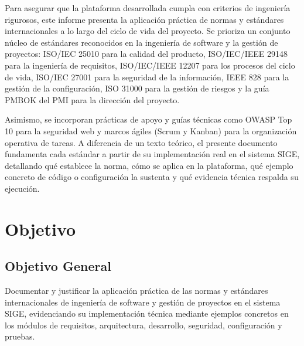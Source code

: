 \documentclass[12pt,a4paper]{article}
\begin{document}
Para asegurar que la plataforma desarrollada cumpla con criterios de ingeniería rigurosos, este informe presenta la aplicación práctica de normas y estándares internacionales a lo largo del ciclo de vida del proyecto. Se prioriza un conjunto núcleo de estándares reconocidos en la ingeniería de software y la gestión de proyectos: ISO/IEC 25010 para la calidad del producto, ISO/IEC/IEEE 29148 para la ingeniería de requisitos, ISO/IEC/IEEE 12207 para los procesos del ciclo de vida, ISO/IEC 27001 para la seguridad de la información, IEEE 828 para la gestión de la configuración, ISO 31000 para la gestión de riesgos y la guía PMBOK del PMI para la dirección del proyecto.

Asimismo, se incorporan prácticas de apoyo y guías técnicas como OWASP Top 10 para la seguridad web y marcos ágiles (Scrum y Kanban) para la organización operativa de tareas. A diferencia de un texto teórico, el presente documento fundamenta cada estándar a partir de su implementación real en el sistema SIGE, detallando qué establece la norma, cómo se aplica en la plataforma, qué ejemplo concreto de código o configuración la sustenta y qué evidencia técnica respalda su ejecución.

\section{Objetivo}

\subsection{Objetivo General}
Documentar y justificar la aplicación práctica de las normas y estándares internacionales de ingeniería de software y gestión de proyectos en el sistema SIGE, evidenciando su implementación técnica mediante ejemplos concretos en los módulos de requisitos, arquitectura, desarrollo, seguridad, configuración y pruebas.
\end{document}
